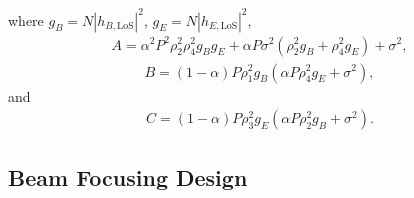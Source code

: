 \documentclass[10pt,technote]{IEEEtran}
\newcommand{\1}{\mathbbm{1}}
\begin{document}
where $g_B = N |h_{B,\mathrm{LoS}}|^2$, $g_E = N |h_{E,\mathrm{LoS}}|^2$,
\begin{align}
A = \alpha^2 P^2\rho_2^2\rho_4^2g_Bg_E+\alpha P\sigma^2(\rho_2^2g_B+\rho_4^2g_E)+\sigma^2,
\end{align}
\begin{align}
B=(1-\alpha)P\rho_1^2g_B(\alpha P\rho_4^2g_E+\sigma^2),
\end{align}
and
\begin{align}
C = (1-\alpha)P\rho_3^2g_E(\alpha P\rho_2^2g_B+\sigma^2).
\end{align}

\subsection{Beam Focusing Design} \label{Sec:beamforcusing}
\end{document}

